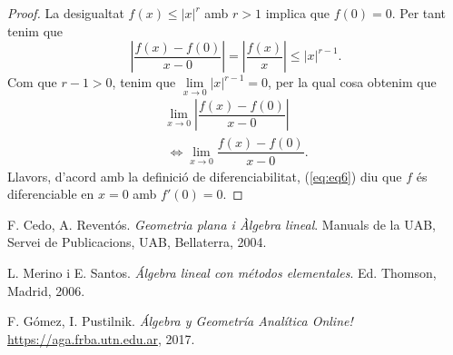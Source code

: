 \documentclass[12pt,a4paper]{article}
\begin{document}
\begin{proof}
La desigualtat $f(x)\leq|x|^{r}$ amb $r>1$ implica que $f(0)=0$. Per tant tenim que
$$\left|\dfrac{f(x)-f(0)}{x-0}\right|=\left|\dfrac{f(x)}{x}\right|\leq|x|^{r-1}.$$
Com que $r-1>0$, tenim que $\lim\limits_{x \to 0}|x|^{r-1}=0$, per la qual cosa obtenim que
\begin{equation} \label{eq:eq6}\begin{split}
\lim_{x \to 0}\left|\dfrac{f(x)-f(0)}{x-0}\right| \\\ \Leftrightarrow \lim_{x \to 0}\dfrac{f(x)-f(0)}{x-0}.
\end{split} \end{equation}
Llavors, d'acord amb la definició de diferenciabilitat, (\ref{eq:eq6}) diu que $f$ és diferenciable en $x=0$ amb $f'(0)=0$.
\end{proof}





\begin{thebibliography}{99\kern2pt}
%
\setlength\itemsep{-1pt}

\newcommand\vvv{\unskip, }
\newcommand\nnn{\unskip, n.\,}
\newcommand\ppp{\unskip\,: }

F. Cedo, A. Reventós.
\textit{Geometria plana i Àlgebra lineal}. Manuals de la UAB, Servei de Publicacions, UAB, Bellaterra, 2004.

L. Merino i E. Santos.
\textit{Álgebra lineal con métodos elementales}. Ed. Thomson, Madrid, 2006.

F. Gómez, I. Pustilnik.
\textit{Álgebra y Geometría Analítica Online!}
\url{https://aga.frba.utn.edu.ar}, 2017.



\end{thebibliography}
\end{document}
